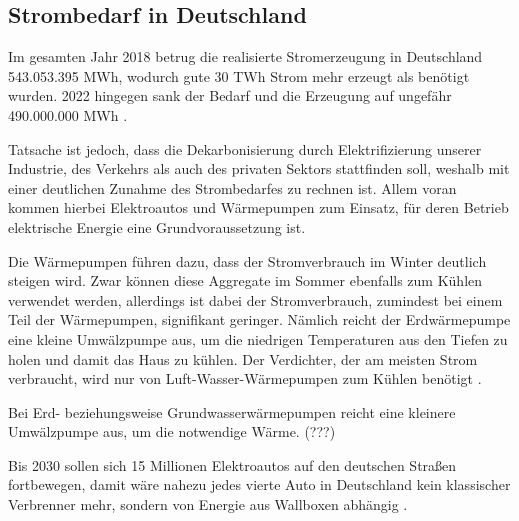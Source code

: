 \documentclass[12pt, a4paper]{article}
\begin{document}
\subsection{Strombedarf in Deutschland}
\label{subsec:energy_need}

Im gesamten Jahr 2018 betrug die realisierte Stromerzeugung in Deutschland 543.053.395 MWh, wodurch gute 30 TWh Strom mehr erzeugt als benötigt wurden. 2022 hingegen sank der Bedarf und die Erzeugung auf ungefähr 490.000.000 MWh \cite{ws:smard}.


Tatsache ist jedoch, dass die Dekarbonisierung durch Elektrifizierung unserer Industrie, des Verkehrs als auch des privaten Sektors stattfinden soll, weshalb mit einer deutlichen Zunahme des Strombedarfes zu rechnen ist. Allem voran kommen hierbei Elektroautos und Wärmepumpen zum Einsatz, für deren Betrieb elektrische Energie eine Grundvoraussetzung ist. 

Die Wärmepumpen führen dazu, dass der Stromverbrauch im Winter deutlich steigen wird. Zwar können diese Aggregate im Sommer ebenfalls zum Kühlen verwendet werden, allerdings ist dabei der Stromverbrauch, zumindest bei einem Teil der Wärmepumpen, signifikant geringer. Nämlich reicht der Erdwärmepumpe eine kleine Umwälzpumpe aus, um die niedrigen Temperaturen aus den Tiefen zu holen und damit das Haus zu kühlen. Der Verdichter, der am meisten Strom verbraucht, wird nur von Luft-Wasser-Wärmepumpen zum Kühlen benötigt \cite{faz2023waermepumpe}.

Bei Erd- beziehungsweise Grundwasserwärmepumpen reicht eine kleinere Umwälzpumpe aus, um die notwendige Wärme. (???) 


Bis 2030 sollen sich 15 Millionen Elektroautos auf den deutschen Straßen fortbewegen, damit wäre nahezu jedes vierte Auto in Deutschland kein klassischer Verbrenner mehr, sondern von Energie aus Wallboxen abhängig \cite{ws:tagesschau}.
\end{document}
